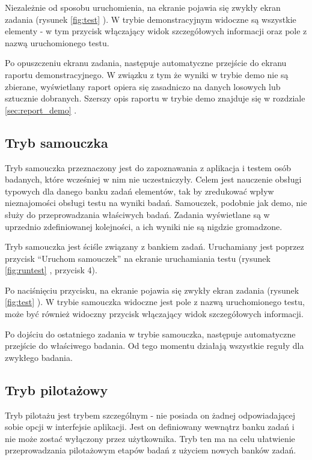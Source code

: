 \documentclass[a4paper,10pt,twosided]{book}
\newcommand{\refwithpage}[3]{
\ref{#1}\ifthenelse{\equal{\thepage}{\pageref{#1}}}{}{#2\pageref{#1}#3}%
}
\newcommand{\pref}[1]{\refwithpage{#1}{ (strona }{)}}
\newcommand{\ppref}[1]{\refwithpage{#1}{ -- strona }{}}
\begin{document}
Niezależnie od sposobu uruchomienia, na ekranie pojawia się zwykły ekran zadania (rysunek \ppref{fig:test}). W trybie demonstracyjnym widoczne są wszystkie elementy - w tym przycisk włączający widok szczegółowych informacji oraz pole z nazwą uruchomionego testu.

Po opuszczeniu ekranu zadania, następuje automatyczne przejście do ekranu raportu demonstracyjnego. W związku z tym że wyniki w trybie demo nie są zbierane, wyświetlany raport opiera się zasadniczo na danych losowych lub sztucznie dobranych. Szerszy opis raportu w trybie demo znajduje się w rozdziale \pref{sec:report_demo}.


\subsection{Tryb samouczka}
\label{sec:test_pilotdemotutorial_tutorial}

Tryb samouczka przeznaczony jest do zapoznawania z aplikacja i testem osób badanych, które wcześniej w nim nie uczestniczyły. Celem jest nauczenie obsługi typowych dla danego banku zadań elementów, tak by zredukować wpływ nieznajomości obsługi testu na wyniki badań. Samouczek, podobnie jak demo, nie służy do przeprowadzania właściwych badań. Zadania wyświetlane są w uprzednio zdefiniowanej kolejności, a ich wyniki nie są nigdzie gromadzone.

Tryb samouczka jest ściśle związany z bankiem zadań. Uruchamiany jest poprzez przycisk ``Uruchom samouczek'' na ekranie uruchamiania testu (rysunek \ppref{fig:runtest}, przycisk 4).

Po naciśnięciu przycisku, na ekranie pojawia się zwykły ekran zadania (rysunek \ppref{fig:test}). W trybie samouczka widoczne jest pole z nazwą uruchomionego testu, może być również widoczny przycisk włączający widok szczegółowych informacji.

Po dojściu do ostatniego zadania w trybie samouczka, następuje automatyczne przejście do właściwego badania. Od tego momentu działają wszystkie reguły dla zwykłego badania.

\subsection{Tryb pilotażowy}
\label{sec:test_pilotdemotutorial_pilot}

Tryb pilotażu jest trybem szczególnym - nie posiada on żadnej odpowiadającej sobie opcji w interfejsie aplikacji. Jest on definiowany wewnątrz banku zadań i nie może zostać wyłączony przez użytkownika. Tryb ten ma na celu ułatwienie przeprowadzania pilotażowym etapów badań z użyciem nowych banków zadań.
\end{document}
